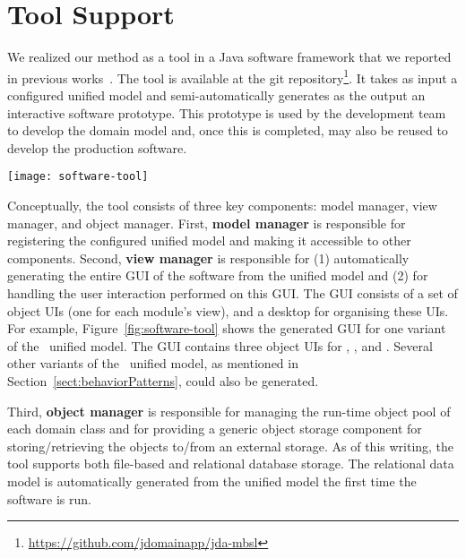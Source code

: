 \section{Tool Support}
\label{sect:tool} %

We realized our method as a tool in a Java software framework that we reported in previous works~\cite{le_domain_2018, le_jdomainapp_2017}. The tool is available at the git repository\footnote{\url{https://github.com/jdomainapp/jda-mbsl}}. It takes as input a configured unified model and semi-automatically generates as the output an interactive software prototype. This prototype is used by the development team to develop the domain model and, once this is completed, may also be reused to develop the production software.

\begin{figure*}[ht]
	\centering
	\texttt{[image: software-tool]}
	\caption{The GUI of \courseman~software generated by the tool: (1) desktop, 
		(2-4) the object UIs of , , and .} %
	\label{fig:software-tool}
\end{figure*}

Conceptually, the tool consists of three key components: model manager, view manager, and object manager. First, \textbf{model manager} is responsible for registering the configured unified model and making it accessible to other components. 
Second, \textbf{view manager} is responsible for (1) automatically generating the entire GUI of the software from the unified model and (2) for handling the user interaction performed on this GUI. The GUI consists of a set of object UIs (one for each module's view), and a desktop for organising these UIs. For example, Figure~\ref{fig:software-tool} shows the generated GUI for one variant of the \courseman~unified model. The GUI contains three object UIs for , , and .
Several other variants of the \courseman~unified model, as mentioned in Section~\ref{sect:behaviorPatterns}, could also be generated. 

Third, \textbf{object manager} is responsible for managing the run-time object pool of each domain class and for providing a generic object storage component for storing/retrieving the objects to/from an external storage. As of this writing, the tool supports both file-based and relational database storage. The relational data model is automatically generated from the unified model the first time the software is run.
